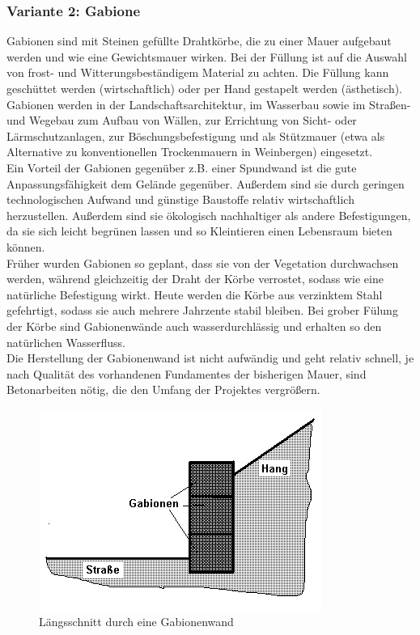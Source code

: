 \documentclass[11pt,fleqn,a4paper]{article}
\begin{document}
\subsubsection*{Variante 2: Gabione}
Gabionen sind mit Steinen gefüllte Drahtkörbe, die zu einer Mauer aufgebaut werden und wie eine Gewichtsmauer wirken. Bei der Füllung ist auf die Auswahl von frost- und Witterungsbeständigem Material zu achten. Die Füllung kann geschüttet werden (wirtschaftlich) oder per Hand gestapelt werden (ästhetisch). Gabionen werden in der Landschaftsarchitektur, im Wasserbau sowie im Straßen- und Wegebau zum Aufbau von Wällen, zur Errichtung von Sicht- oder Lärmschutzanlagen, zur Böschungsbefestigung und als Stützmauer (etwa als Alternative zu konventionellen Trockenmauern in Weinbergen) eingesetzt. \\
Ein Vorteil der Gabionen gegenüber z.B. einer Spundwand ist die gute Anpassungsfähigkeit dem Gelände gegenüber. Außerdem sind sie durch geringen technologischen Aufwand und günstige Baustoffe relativ wirtschaftlich herzustellen. Außerdem sind sie ökologisch nachhaltiger als andere Befestigungen, da sie sich leicht begrünen lassen und so Kleintieren einen Lebensraum bieten können. \\
Früher wurden Gabionen so geplant, dass sie von der Vegetation durchwachsen werden, während gleichzeitig der Draht der Körbe verrostet, sodass wie eine natürliche Befestigung wirkt. Heute werden die Körbe aus verzinktem Stahl gefehrtigt, sodass sie auch mehrere Jahrzente stabil bleiben. Bei grober Fülung der Körbe sind Gabionenwände auch wasserdurchlässig und erhalten so den natürlichen Wasserfluss.\\
Die Herstellung der Gabionenwand ist nicht aufwändig und geht relativ schnell, je nach Qualität des vorhandenen Fundamentes der bisherigen Mauer, sind Betonarbeiten nötig, die den Umfang der Projektes vergrößern.
\begin{figure}[h!]
\includegraphics[scale=0.8]{Gabionenwand.png}
\caption{Längsschnitt durch eine Gabionenwand \cite{gabio}}
\end{figure}
\end{document}
